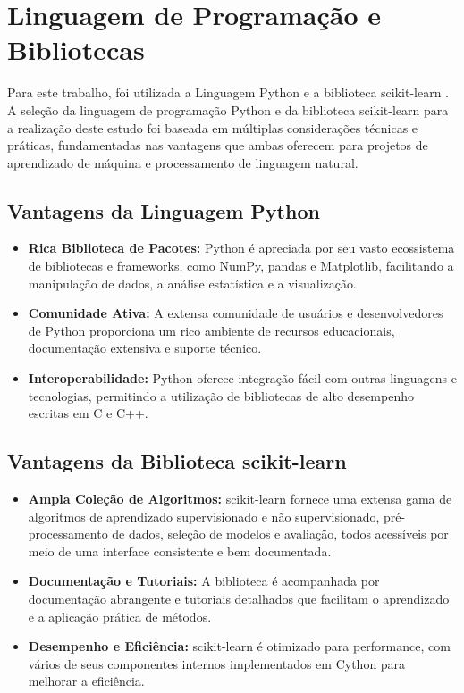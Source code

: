 \section{Linguagem de Programação e Bibliotecas}

Para este trabalho, foi utilizada a Linguagem Python \cite{10.5555/1593511} e a biblioteca scikit-learn \cite{pedregosa2011scikit}.  A seleção da linguagem de programação Python e da biblioteca scikit-learn para a realização deste estudo foi baseada em múltiplas considerações técnicas e práticas, fundamentadas nas vantagens que ambas oferecem para projetos de aprendizado de máquina e processamento de linguagem natural.

\subsection{Vantagens da Linguagem Python}
\begin{itemize}
    \item \textbf{Rica Biblioteca de Pacotes:} Python é apreciada por seu vasto ecossistema de bibliotecas e frameworks, como NumPy, pandas e Matplotlib, facilitando a manipulação de dados, a análise estatística e a visualização.
    \item \textbf{Comunidade Ativa:} A extensa comunidade de usuários e desenvolvedores de Python proporciona um rico ambiente de recursos educacionais, documentação extensiva e suporte técnico.
    \item \textbf{Interoperabilidade:} Python oferece integração fácil com outras linguagens e tecnologias, permitindo a utilização de bibliotecas de alto desempenho escritas em C e C++.
\end{itemize}

\subsection{Vantagens da Biblioteca scikit-learn}
\begin{itemize}
    \item \textbf{Ampla Coleção de Algoritmos:} scikit-learn fornece uma extensa gama de algoritmos de aprendizado supervisionado e não supervisionado, pré-processamento de dados, seleção de modelos e avaliação, todos acessíveis por meio de uma interface consistente e bem documentada.
    \item \textbf{Documentação e Tutoriais:} A biblioteca é acompanhada por documentação abrangente e tutoriais detalhados que facilitam o aprendizado e a aplicação prática de métodos.
    \item \textbf{Desempenho e Eficiência:} scikit-learn é otimizado para performance, com vários de seus componentes internos implementados em Cython para melhorar a eficiência.
\end{itemize}

